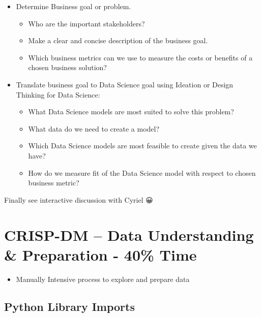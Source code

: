 \documentclass[11pt]{article}
\providecommand{\tightlist}{%
      \setlength{\itemsep}{0pt}\setlength{\parskip}{0pt}}
\begin{document}
\begin{itemize}
\tightlist
\item
  Determine Business goal or problem.

  \begin{itemize}
  \tightlist
  \item
    Who are the important stakeholders?
  \item
    Make a clear and concise description of the business goal.
  \item
    Which business metrics can we use to measure the costs or benefits
    of a chosen business solution?
  \end{itemize}
\item
  Translate business goal to Data Science goal using Ideation or Design
  Thinking for Data Science:

  \begin{itemize}
  \tightlist
  \item
    What Data Science models are most suited to solve this problem?
  \item
    What data do we need to create a model?
  \item
    Which Data Science models are most feasible to create given the data
    we have?
  \item
    How do we measure fit of the Data Science model with respect to
    chosen business metric?
  \end{itemize}
\end{itemize}

Finally see interactive discussion with Cyriel 😀

    \hypertarget{crisp-dm-data-understanding-preparation---40-time}{%
\section{CRISP-DM -- Data Understanding \& Preparation - 40\%
Time}\label{crisp-dm-data-understanding-preparation---40-time}}

\begin{itemize}
\tightlist
\item
  Manually Intensive process to explore and prepare data
\end{itemize}

    \hypertarget{python-library-imports}{%
\subsection{Python Library Imports}\label{python-library-imports}}
\end{document}
